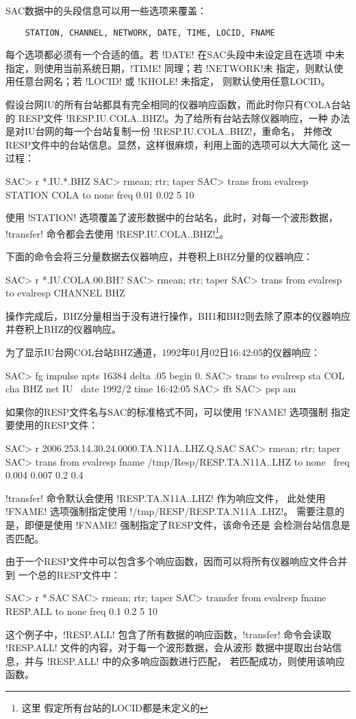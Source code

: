 SAC数据中的头段信息可以用一些选项来覆盖：
\begin{verbatim}
    STATION, CHANNEL, NETWORK, DATE, TIME, LOCID, FNAME
\end{verbatim}
每个选项都必须有一个合适的值。若 !DATE! 在SAC头段中未设定且在选项
中未指定，则使用当前系统日期，!TIME! 同理；若 !NETWORK!未
指定，则默认使用任意台网名；若 !LOCID! 或 !KHOLE! 未指定，
则默认使用任意LOCID。

假设台网IU的所有台站都具有完全相同的仪器响应函数，而此时你只有COLA台站的
RESP文件 !RESP.IU.COLA..BHZ!。为了给所有台站去除仪器响应，一种
办法是对IU台网的每一个台站复制一份 !RESP.IU.COLA..BHZ!，重命名，
并修改RESP文件中的台站信息。显然，这样很麻烦，利用上面的选项可以大大简化
这一过程：
\begin{SACCode}
SAC> r *.IU.*.BHZ
SAC> rmean; rtr; taper
SAC> trans from evalresp STATION COLA to none freq 0.01 0.02 5 10
\end{SACCode}
使用 !STATION! 选项覆盖了波形数据中的台站名，此时，对每一个波形数据，
!transfer! 命令都会去使用 !RESP.IU.COLA..BHZ!\footnote{这里
假定所有台站的LOCID都是未定义的}。

下面的命令会将三分量数据去仪器响应，并卷积上BHZ分量的仪器响应：
\begin{SACCode}
SAC> r *.IU.COLA.00.BH?
SAC> rmean; rtr; taper
SAC> trans from evalresp to evalresp CHANNEL BHZ
\end{SACCode}
操作完成后，BHZ分量相当于没有进行操作，BH1和BH2则去除了原本的仪器响应
并卷积上BHZ的仪器响应。

为了显示IU台网COL台站BHZ通道，1992年01月02日16:42:05的仪器响应：
\begin{SACCode}
SAC> fg impulse npts 16384 delta .05 begin 0.
SAC> trans to evalresp sta COL cha BHZ net IU \
                    date 1992/2 time 16:42:05
SAC> fft
SAC> psp am
\end{SACCode}

如果你的RESP文件名与SAC的标准格式不同，可以使用 !FNAME! 选项强制
指定要使用的RESP文件：
\begin{SACCode}
SAC> r 2006.253.14.30.24.0000.TA.N11A..LHZ.Q.SAC
SAC> rmean; rtr; taper
SAC> trans from evalresp fname /tmp/Resp/RESP.TA.N11A..LHZ to none \
                        freq 0.004 0.007 0.2 0.4
\end{SACCode}
!transfer! 命令默认会使用 !RESP.TA.N11A..LHZ! 作为响应文件，
此处使用 !FNAME! 选项强制指定使用 !/tmp/RESP/RESP.TA.N11A..LHZ!。
需要注意的是，即便是使用 !FNAME! 强制指定了RESP文件，该命令还是
会检测台站信息是否匹配。

由于一个RESP文件中可以包含多个响应函数，因而可以将所有仪器响应文件合并到
一个总的RESP文件中：
\begin{SACCode}
SAC> r *.SAC
SAC> rmean; rtr; taper
SAC> transfer from evalresp fname RESP.ALL to none freq 0.1 0.2 5 10
\end{SACCode}
这个例子中，!RESP.ALL! 包含了所有数据的响应函数，!transfer!
命令会读取 !RESP.ALL! 文件的内容，对于每一个波形数据，会从波形
数据中提取出台站信息，并与 !RESP.ALL! 中的众多响应函数进行匹配，
若匹配成功，则使用该响应函数。

